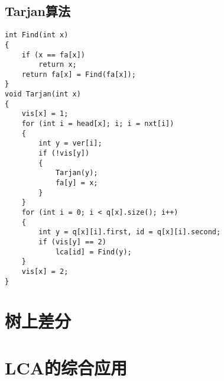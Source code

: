 \subsection{Tarjan算法}
\begin{lstlisting}
int Find(int x)
{
    if (x == fa[x])
        return x;
    return fa[x] = Find(fa[x]);
}
void Tarjan(int x)
{
    vis[x] = 1;
    for (int i = head[x]; i; i = nxt[i])
    {
        int y = ver[i];
        if (!vis[y])
        {
            Tarjan(y);
            fa[y] = x;
        }
    }
    for (int i = 0; i < q[x].size(); i++)
    {
        int y = q[x][i].first, id = q[x][i].second;
        if (vis[y] == 2)
            lca[id] = Find(y);
    }
    vis[x] = 2;
}
\end{lstlisting}

\section{树上差分}
\section{LCA的综合应用}
